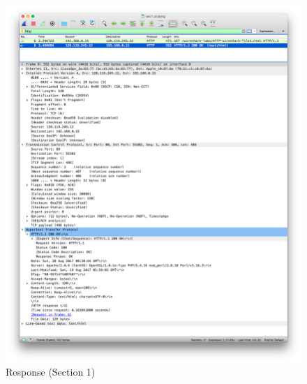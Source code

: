 \documentclass[11pt]{article}
\begin{document}
\begin{figure}[H]
\centering
\caption{Response (Section 1)}
\includegraphics[width=\textwidth]{01-response}
\end{figure}

\pagebreak
\end{document}
